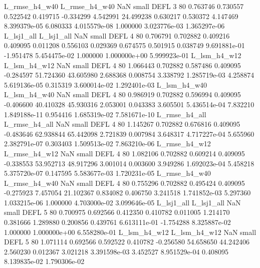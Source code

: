 L_rmse_h4_w40 L_rmse_h4_w40                   NaN      small     DEFL                 3 80 0.763746       0.730557 0.522542       0.419715   -0.334299      4.542991     24.499238     0.630217       0.530372  4.147469 8.399379e-05     6.080333   4.015579e-08            1.000000    3.023776e-03        1.365297e-06
   L_lsj1_all    L_lsj1_all                   NaN      small     DEFL                 4 80 0.706791       0.702882 0.409216       0.409095    0.011208      0.556103      0.029369     0.674575       0.501915  0.038749 9.691881e-01    -1.951478   5.454475e-02            1.000000    1.000000e+00        5.999923e-01
 L_lsm_h4_w12  L_lsm_h4_w12                   NaN      small     DEFL                 4 80 1.066443       0.702882 0.587486       0.409095   -0.284597     51.724360     43.605980     2.688368       0.008754  3.338792 1.285719e-03     4.258874   5.619136e-05            0.315319    3.600014e-02        1.292401e-03
 L_lsm_h4_w40  L_lsm_h4_w40                   NaN      small     DEFL                 4 80 0.986919       0.702882 0.596994       0.409095   -0.406600     40.410328     45.930316     2.053001       0.043383  3.605501 5.436514e-04     7.832210   1.849188e-11            0.954416    1.685319e-02        7.581671e-10
L_rmse_h4_all L_rmse_h4_all                   NaN      small     DEFL                 4 80 1.145267       0.702882 0.676816       0.409095   -0.483646     62.938844     65.442098     2.721839       0.007984  3.648317 4.717227e-04     5.655960   2.382791e-07            0.303403    1.509513e-02        7.863210e-06
L_rmse_h4_w12 L_rmse_h4_w12                   NaN      small     DEFL                 4 80 1.082106       0.702882 0.609214       0.409095   -0.338553     53.952713     48.917296     3.001014       0.003600  3.949286 1.692023e-04     5.458218   5.375720e-07            0.147595    5.583677e-03        1.720231e-05
L_rmse_h4_w40 L_rmse_h4_w40                   NaN      small     DEFL                 4 80 0.755296       0.702882 0.495424       0.409095   -0.275923      7.457054     21.102367     0.834082       0.406750  3.241518 1.741852e-03     5.297360   1.033215e-06            1.000000    4.703000e-02        3.099646e-05
   L_lsj1_all    L_lsj1_all                   NaN      small     DEFL                 5 80 0.700975       0.692566 0.412350       0.410782    0.011005      1.214170      0.381666     1.289880       0.200856  0.439761 6.613111e-01    -1.754288   8.325887e-02            1.000000    1.000000e+00        6.558280e-01
 L_lsm_h4_w12  L_lsm_h4_w12                   NaN      small     DEFL                 5 80 1.071114       0.692566 0.592522       0.410782   -0.256580     54.658650     44.242406     2.560230       0.012367  3.021218 3.391598e-03     3.452527   8.951529e-04            0.408095    8.139835e-02        1.790306e-02
